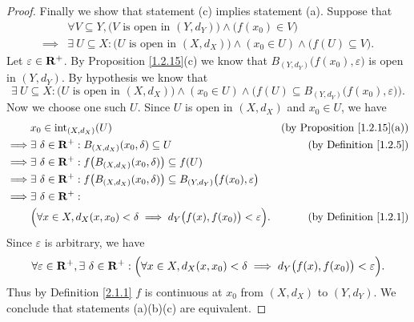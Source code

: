 \begin{proof}
    Finally we show that statement (c) implies statement (a).
    Suppose that
    \begin{align*}
                 & \forall V \subseteq Y, \big(V \text{ is open in } (Y, d_Y)\big) \land \big(f(x_0) \in V\big)                          \\
        \implies & \exists\ U \subseteq X : \big(U \text{ is open in } (X, d_X)\big) \land (x_0 \in U) \land \big(f(U) \subseteq V\big).
    \end{align*}
    Let \(\varepsilon \in \mathbf{R}^+\).
    By Proposition \ref{1.2.15}(c) we know that \(B_{(Y, d_Y)}\big(f(x_0), \varepsilon\big)\) is open in \((Y, d_Y)\).
    By hypothesis we know that
    \[
        \exists\ U \subseteq X : \big(U \text{ is open in } (X, d_X)\big) \land (x_0 \in U) \land \Big(f(U) \subseteq B_{(Y, d_Y)}\big(f(x_0), \varepsilon\big)\Big).
    \]
    Now we choose one such \(U\).
    Since \(U\) is open in \((X, d_X)\) and \(x_0 \in U\), we have
    \begin{align*}
                 & x_0 \in \text{int}_{(X, d_X)}(U)                                                                                    & \text{(by Proposition \ref{1.2.15}(a))} \\
        \implies & \exists\ \delta \in \mathbf{R}^+ : B_{(X, d_X)}(x_0, \delta) \subseteq U                                                    & \text{(by Definition \ref{1.2.5})}      \\
        \implies & \exists\ \delta \in \mathbf{R}^+ : f\big(B_{(X, d_X)}(x_0, \delta)\big) \subseteq f(U)                                                                                \\
        \implies & \exists\ \delta \in \mathbf{R}^+ : f\big(B_{(X, d_X)}(x_0, \delta)\big) \subseteq B_{(Y, d_Y)}\big(f(x_0), \varepsilon\big)                                           \\
        \implies & \exists\ \delta \in \mathbf{R}^+ :                                                                                                                                    \\
                 & \Big(\forall x \in X, d_X(x, x_0) < \delta \implies d_Y\big(f(x), f(x_0)\big) < \varepsilon\Big).                   & \text{(by Definition \ref{1.2.1})}
    \end{align*}
    Since \(\varepsilon\) is arbitrary, we have
    \[
        \forall \varepsilon \in \mathbf{R}^+, \exists\ \delta \in \mathbf{R}^+ : \Big(\forall x \in X, d_X(x, x_0) < \delta \implies d_Y\big(f(x), f(x_0)\big) < \varepsilon\Big).
    \]
    Thus by Definition \ref{2.1.1} \(f\) is continuous at \(x_0\) from \((X, d_X)\) to \((Y, d_Y)\).
    We conclude that statements (a)(b)(c) are equivalent.
\end{proof}

